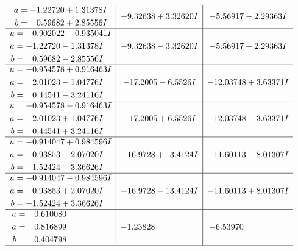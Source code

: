 \documentclass[1p]{elsarticle_modified}
\theoremstyle{definition}
\begin{document}
$$\begin{array}{c|c|c}
\begin{aligned}
a &= -1.22720 + 1.31378 I \\
b &= \phantom{-}0.59682 + 2.85556 I\end{aligned}
 & -9.32638 + 3.32620 I & -5.56917 - 2.29363 I \\ \hline\begin{aligned}
u &= -0.902022 - 0.935041 I \\
a &= -1.22720 - 1.31378 I \\
b &= \phantom{-}0.59682 - 2.85556 I\end{aligned}
 & -9.32638 - 3.32620 I & -5.56917 + 2.29363 I \\ \hline\begin{aligned}
u &= -0.954578 + 0.916463 I \\
a &= \phantom{-}2.01023 - 1.04776 I \\
b &= \phantom{-}0.44541 - 3.24116 I\end{aligned}
 & -17.2005 - 6.5526 I & -12.03748 + 3.63371 I \\ \hline\begin{aligned}
u &= -0.954578 - 0.916463 I \\
a &= \phantom{-}2.01023 + 1.04776 I \\
b &= \phantom{-}0.44541 + 3.24116 I\end{aligned}
 & -17.2005 + 6.5526 I & -12.03748 - 3.63371 I \\ \hline\begin{aligned}
u &= -0.914047 + 0.984596 I \\
a &= \phantom{-}0.93853 - 2.07020 I \\
b &= -1.52424 - 3.36626 I\end{aligned}
 & -16.9728 + 13.4124 I & -11.60113 - 8.01307 I \\ \hline\begin{aligned}
u &= -0.914047 - 0.984596 I \\
a &= \phantom{-}0.93853 + 2.07020 I \\
b &= -1.52424 + 3.36626 I\end{aligned}
 & -16.9728 - 13.4124 I & -11.60113 + 8.01307 I \\ \hline\begin{aligned}
u &= \phantom{-}0.610080\phantom{ +0.000000I} \\
a &= \phantom{-}0.816899\phantom{ +0.000000I} \\
b &= \phantom{-}0.404798\phantom{ +0.000000I}\end{aligned}
 & -1.23828\phantom{ +0.000000I} & -6.53970\phantom{ +0.000000I}\\
 \hline 
 \end{array}$$\newpage\newpage\renewcommand{\arraystretch}{1}
\end{document}
